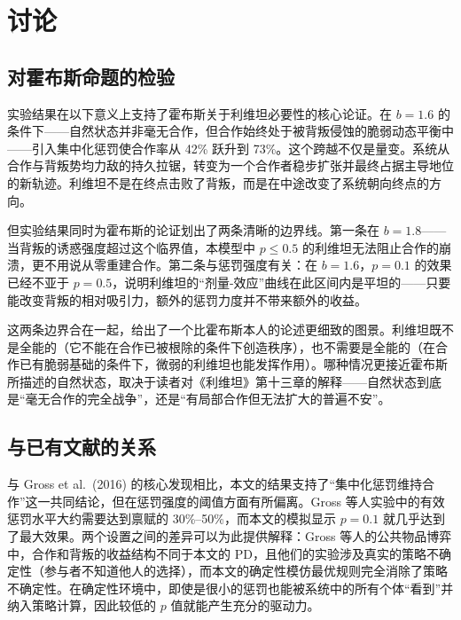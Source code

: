 \documentclass[12pt,a4paper]{ctexart}
\begin{document}
\section{讨论}

\subsection{对霍布斯命题的检验}

实验结果在以下意义上支持了霍布斯关于利维坦必要性的核心论证。在 $b=1.6$ 的条件下——自然状态并非毫无合作，但合作始终处于被背叛侵蚀的脆弱动态平衡中——引入集中化惩罚使合作率从 42\% 跃升到 73\%。这个跨越不仅是量变。系统从合作与背叛势均力敌的持久拉锯，转变为一个合作者稳步扩张并最终占据主导地位的新轨迹。利维坦不是在终点击败了背叛，而是在中途改变了系统朝向终点的方向。

但实验结果同时为霍布斯的论证划出了两条清晰的边界线。第一条在 $b=1.8$——当背叛的诱惑强度超过这个临界值，本模型中 $p \le 0.5$ 的利维坦无法阻止合作的崩溃，更不用说从零重建合作。第二条与惩罚强度有关：在 $b=1.6$，$p=0.1$ 的效果已经不亚于 $p=0.5$，说明利维坦的“剂量-效应”曲线在此区间内是平坦的——只要能改变背叛的相对吸引力，额外的惩罚力度并不带来额外的收益。

这两条边界合在一起，给出了一个比霍布斯本人的论述更细致的图景。利维坦既不是全能的（它不能在合作已被根除的条件下创造秩序），也不需要是全能的（在合作已有脆弱基础的条件下，微弱的利维坦也能发挥作用）。哪种情况更接近霍布斯所描述的自然状态，取决于读者对《利维坦》第十三章的解释——自然状态到底是“毫无合作的完全战争”，还是“有局部合作但无法扩大的普遍不安”。

\subsection{与已有文献的关系}

与 Gross et al.\ (2016) 的核心发现相比，本文的结果支持了“集中化惩罚维持合作”这一共同结论，但在惩罚强度的阈值方面有所偏离。Gross 等人实验中的有效惩罚水平大约需要达到禀赋的 30\%--50\%，而本文的模拟显示 $p=0.1$ 就几乎达到了最大效果。两个设置之间的差异可以为此提供解释：Gross 等人的公共物品博弈中，合作和背叛的收益结构不同于本文的 PD，且他们的实验涉及真实的策略不确定性（参与者不知道他人的选择），而本文的确定性模仿最优规则完全消除了策略不确定性。在确定性环境中，即使是很小的惩罚也能被系统中的所有个体“看到”并纳入策略计算，因此较低的 $p$ 值就能产生充分的驱动力。
\end{document}

